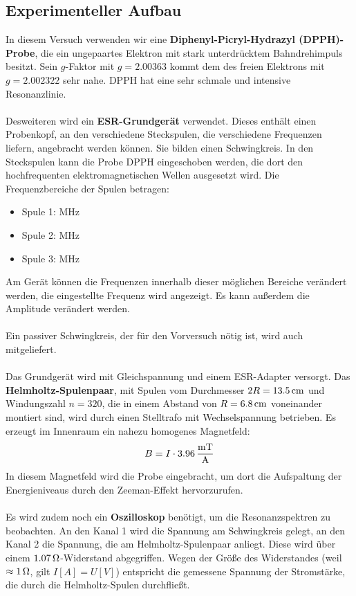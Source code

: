 \documentclass[a4paper,titlepage]{scrartcl}
\numberwithin{equation}{section}
\begin{document}
\subsection{Experimenteller Aufbau}
In diesem Versuch verwenden wir eine \textbf{Diphenyl-Picryl-Hydrazyl (DPPH)-Probe}, die ein ungepaartes Elektron mit stark unterdrücktem Bahndrehimpuls besitzt. Sein $g$-Faktor mit $g=2.00363$ kommt dem des freien Elektrons mit $g=2.002322$ sehr nahe. DPPH hat eine sehr schmale und intensive Resonanzlinie.\\ \\
Desweiteren wird ein \textbf{ESR-Grundgerät} verwendet. Dieses enthält einen Probenkopf, an den verschiedene Steckspulen, die verschiedene Frequenzen liefern, angebracht werden können. Sie bilden einen Schwingkreis. In den Steckspulen kann die Probe DPPH eingeschoben werden, die dort den hochfrequenten elektromagnetischen Wellen ausgesetzt wird. Die Frequenzbereiche der Spulen betragen:
\begin{itemize}
\item Spule 1: \unit[13-30]{MHz}
\item Spule 2: \unit[30-75]{MHz}
\item Spule 3: \unit[75-130]{MHz}
\end{itemize}
Am Gerät können die Frequenzen innerhalb dieser möglichen Bereiche verändert werden, die eingestellte Frequenz wird angezeigt. Es kann außerdem die Amplitude verändert werden.\\ \\
Ein passiver Schwingkreis, der für den Vorversuch nötig ist, wird auch mitgeliefert.\\ \\
Das Grundgerät wird mit Gleichspannung und einem ESR-Adapter versorgt. Das \textbf{Helmholtz-Spulenpaar}, mit Spulen vom Durchmesser $2R=\unit[13.5]{cm}$ und Windungszahl $n=320$, die in einem Abstand von $R=\unit[6.8]{cm}$ voneinander montiert sind, wird durch einen Stelltrafo mit Wechselspannung betrieben. Es erzeugt im Innenraum ein nahezu homogenes Magnetfeld:
\begin{equation}
\label{eq:esrMagnetfeld}
B=I \cdot \unit[3.96]{\frac{mT}{A}}
\end{equation}
In diesem Magnetfeld wird die Probe eingebracht, um dort die Aufspaltung der Energieniveaus durch den Zeeman-Effekt hervorzurufen.\\ \\
Es wird zudem noch ein \textbf{Oszilloskop} benötigt, um die Resonanzspektren zu beobachten. An den Kanal 1 wird die Spannung am Schwingkreis gelegt, an den Kanal 2 die Spannung, die am Helmholtz-Spulenpaar anliegt. Diese wird über einem $\unit[1.07]{\Omega}$-Widerstand abgegriffen. Wegen der Größe des Widerstandes (weil $\approx \unit[1]{\Omega}$, gilt $I[A]=U[V]$) entspricht die gemessene Spannung der Stromstärke, die durch die Helmholtz-Spulen durchfließt.
\end{document}
